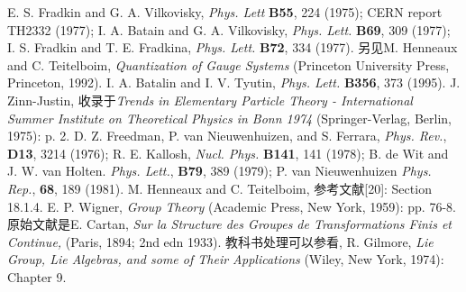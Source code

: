\begin{thebibliography}{99}
E. S. Fradkin and G. A. Vilkovisky, {\textit{Phys. Lett}} {\bf{B55}}, 224 (1975); CERN report TH2332 (1977); I. A. Batain and G. A. Vilkovisky, {\textit{Phys. Lett.}} {\bf{B69}}, 309 (1977); I. S. Fradkin and T. E. Fradkina, {\textit{Phys. Lett.}} {\bf{B72}}, 334 (1977). 另见M. Henneaux and C. Teitelboim, {\textit{Quantization of Gauge Systems}} (Princeton University Press, Princeton, 1992).
I. A. Batalin and I. V. Tyutin, {\textit{Phys. Lett.}} {\bf{B356}}, 373 (1995).
J. Zinn-Justin, 收录于{\textit{Trends in Elementary Particle Theory - International Summer Institute on Theoretical Physics in Bonn 1974}} (Springer-Verlag, Berlin, 1975): p. 2.
D. Z. Freedman, P. van Nieuwenhuizen, and S. Ferrara, {\textit{Phys. Rev.}}, {\bf{D13}}, 3214 (1976); R. E. Kallosh, {\textit{Nucl. Phys.}} {\bf{B141}}, 141 (1978); B. de Wit and J. W. van Holten. {\textit{Phys. Lett.}}, {\bf{B79}}, 389 (1979); P. van Nieuwenhuizen {\textit{Phys. Rep.}}, {\bf{68}}, 189 (1981).
M. Henneaux and C. Teitelboim, 参考文献[20]: Section 18.1.4.
E. P. Wigner, {\textit{Group Theory}} (Academic Press, New York, 1959): pp. 76-8.
原始文献是E. Cartan, {\textit{Sur la Structure des Groupes de Transformations Finis et Continue,}} (Paris, 1894; 2nd edn 1933). 教科书处理可以参看, R. Gilmore, {\textit{Lie Group, Lie Algebras, and some of Their Applications}} (Wiley, New York, 1974): Chapter 9.
\end{thebibliography}



